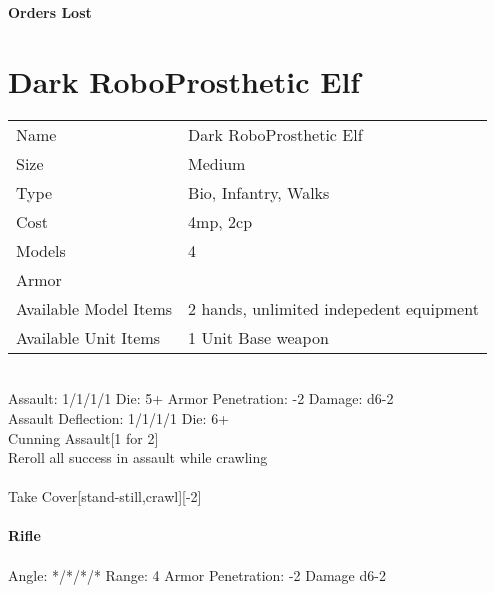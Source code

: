 {\bf Orders Lost }

\noindent 
\pagebreak

\section{ Dark RoboProsthetic Elf }

\begin{tabular}{ll}
  Name & Dark RoboProsthetic Elf \\
  Size & Medium\\
  Type & Bio, Infantry, Walks\\
  Cost & 4mp, 2cp\\
  Models & 4\\
  Armor & \\
  Available Model Items & 2 hands, unlimited indepedent equipment \\
  Available Unit Items & 1 Unit Base weapon \\
\end{tabular}

\ \\
Assault: 1/1/1/1 Die: 5+ Armor Penetration: -2 Damage: d6-2 \\
Assault Deflection: 1/1/1/1 Die: 6+\\
\indent Cunning Assault[1 for 2]\\ Reroll all success in assault while crawling \\
\ \\
Take Cover[stand-still,crawl][-2]
\ \\
\ \\
{\bf Rifle } \\
\ \\
Angle: */*/*/* Range: 4 Armor Penetration: -2 Damage d6-2 \\
\indent  \\





